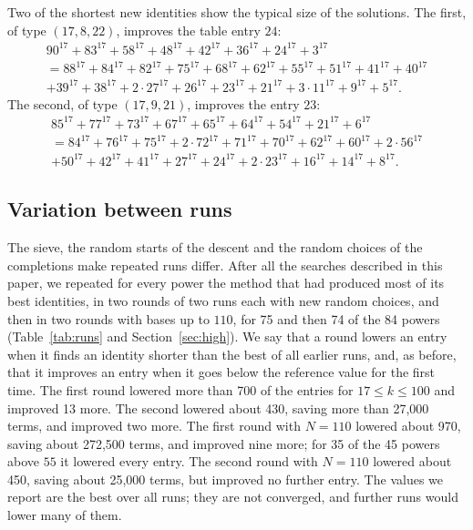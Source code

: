 \documentclass[11pt]{amsart}
\theoremstyle{definition}
\theoremstyle{remark}
\begin{document}
\begin{table}[htbp]
\centering\small

\caption{Improvements by power, separated into entries attained by an identity in the table
and entries that are derived bounds, with the total number of terms saved and the largest
saving in a single entry.}\label{tab:perk}
\end{table}

Two of the shortest new identities show the typical size of the solutions. The first, of
type $(17,8,22)$, improves the table entry $24$:
\begin{multline*}
90^{17}+83^{17}+58^{17}+48^{17}+42^{17}+36^{17}+24^{17}+3^{17}\\
=88^{17}+84^{17}+82^{17}+75^{17}+68^{17}+62^{17}+55^{17}+51^{17}+41^{17}+40^{17}\\
+39^{17}+38^{17}+2\cdot27^{17}+26^{17}+23^{17}+21^{17}+3\cdot11^{17}+9^{17}+5^{17}.
\end{multline*}
The second, of type $(17,9,21)$, improves the entry $23$:
\begin{multline*}
85^{17}+77^{17}+73^{17}+67^{17}+65^{17}+64^{17}+54^{17}+21^{17}+6^{17}\\
=84^{17}+76^{17}+75^{17}+2\cdot72^{17}+71^{17}+70^{17}+62^{17}+60^{17}+2\cdot56^{17}\\
+50^{17}+42^{17}+41^{17}+27^{17}+24^{17}+2\cdot23^{17}+16^{17}+14^{17}+8^{17}.
\end{multline*}

\subsection{Variation between runs}\label{sec:variation}
The sieve, the random starts of the descent and the random choices of the completions make
repeated runs differ. After all the searches described in this paper, we repeated for every
power the method that had produced most of its best identities, in two rounds of two runs
each with new random choices, and then in two rounds with bases up to $110$, for 75 and then 74
of the 84 powers (Table~\ref{tab:runs} and Section~\ref{sec:high}). We say that a round lowers
an entry when it finds an identity shorter than the best of all earlier runs, and, as before,
that it improves an entry when it goes below the reference value for the first time. The first
round lowered more than 700 of the entries for $17\le k\le100$ and improved 13 more. The second
lowered about 430, saving more than 27,000 terms, and improved two more. The first round with
$N=110$ lowered about 970, saving about 272,500 terms, and improved nine more; for 35 of the 45
powers above $55$ it lowered every entry. The second round with $N=110$ lowered about 450,
saving about 25,000 terms, but improved no further entry. The values we report are the best over all runs; they are not
converged, and further runs would lower many of them.
\end{document}
